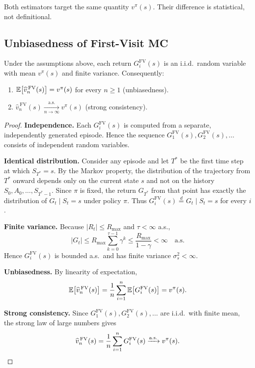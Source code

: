 Both estimators target the same quantity $v^\pi(s)$.  Their difference is statistical, not definitional.

\subsection*{Unbiasedness of First-Visit MC}

\begin{theorem}
\label{thm:fv-unbiased}
Under the assumptions above, each return $G_i^{\mathrm{FV}}(s)$ is an i.i.d.\ random variable with mean $v^\pi(s)$ and finite variance.  Consequently:
\begin{enumerate}
  \item $\operatorname{\mathbb{E}}\!\left[\widehat{v}_n^{\,\mathrm{FV}}(s)\right] = v^\pi(s)$ for every $n \ge 1$ (unbiasedness).
  \item $\widehat{v}_n^{\,\mathrm{FV}}(s) \xrightarrow[n \to \infty]{\mathrm{a.s.}} v^\pi(s)$ (strong consistency).
\end{enumerate}
\end{theorem}

\begin{proof}
\textbf{Independence.}  Each $G_i^{\mathrm{FV}}(s)$ is computed from a separate, independently generated episode.  Hence the sequence $G_1^{\mathrm{FV}}(s), G_2^{\mathrm{FV}}(s), \dots$ consists of independent random variables.

\textbf{Identical distribution.}  Consider any episode and let $T^*$ be the first time step at which $S_{T^*} = s$.  By the Markov property, the distribution of the trajectory from $T^*$ onward depends only on the current state $s$ and not on the history $S_0, A_0, \dots, S_{T^*-1}$.  Since $\pi$ is fixed, the return $G_{T^*}$ from that point has exactly the distribution of $G_t \mid S_t = s$ under policy $\pi$.  Thus $G_i^{\mathrm{FV}}(s) \stackrel{d}{=} G_t \mid S_t = s$ for every $i$.

\textbf{Finite variance.}  Because $|R_t| \le R_{\max}$ and $\tau < \infty$ a.s.,
\[
  |G_t| \le R_{\max} \sum_{k=0}^{\tau-1} \gamma^k \le \frac{R_{\max}}{1-\gamma} < \infty \quad \text{a.s.}
\]
Hence $G_i^{\mathrm{FV}}(s)$ is bounded a.s.\ and has finite variance $\sigma_s^2 < \infty$.

\textbf{Unbiasedness.}  By linearity of expectation,
\[
  \operatorname{\mathbb{E}}\!\left[\widehat{v}_n^{\,\mathrm{FV}}(s)\right]
  = \frac{1}{n} \sum_{i=1}^{n} \operatorname{\mathbb{E}}\!\left[G_i^{\mathrm{FV}}(s)\right]
  = v^\pi(s).
\]

\textbf{Strong consistency.}  Since $G_1^{\mathrm{FV}}(s), G_2^{\mathrm{FV}}(s), \dots$ are i.i.d.\ with finite mean, the strong law of large numbers gives
\[
  \widehat{v}_n^{\,\mathrm{FV}}(s) = \frac{1}{n}\sum_{i=1}^{n} G_i^{\mathrm{FV}}(s) \xrightarrow{\mathrm{a.s.}} v^\pi(s). \qedhere
\]
\end{proof}

